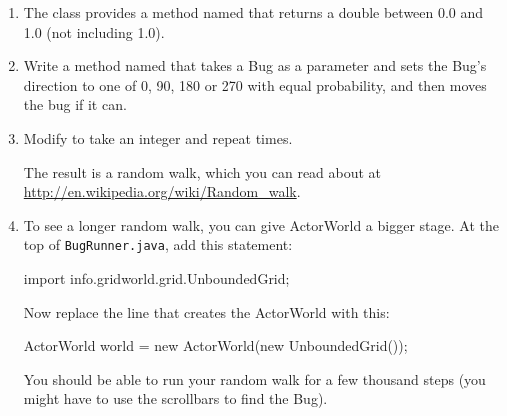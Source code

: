 \begin{exercise}

\begin{enumerate}

\item The  class provides a method named  that returns a double between 0.0 and 1.0 (not including 1.0).

\item Write a method named  that takes a Bug as a parameter and sets the Bug's direction to one of 0, 90, 180 or 270 with equal probability, and then moves the bug if it can.

\item Modify  to take an integer  and repeat  times.

The result is a random walk, which you can read about at \url{http://en.wikipedia.org/wiki/Random_walk}.

\item To see a longer random walk, you can give ActorWorld a bigger stage.
At the top of {\tt BugRunner.java}, add this  statement:

\begin{code}
import info.gridworld.grid.UnboundedGrid;
\end{code}

Now replace the line that creates the ActorWorld with this:

\begin{code}
    ActorWorld world = new ActorWorld(new UnboundedGrid());
\end{code}

You should be able to run your random walk for a few thousand steps (you might have to use the scrollbars to find the Bug).

\end{enumerate}
\end{exercise}


